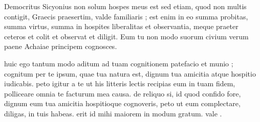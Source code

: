 


 Democritus Sicyonius non solum hospes meus est sed etiam, quod non multis contigit, Graecis praesertim, valde familiaris ; est enim in eo summa probitas, summa virtus, summa in hospites liberalitas et observantia, meque praeter ceteros et colit et observat et diligit. Eum tu non modo suorum civium verum paene Achaiae principem cognosces.

 huic ego tantum modo aditum ad tuam cognitionem patefacio et munio ; cognitum per te ipsum, quae tua natura est, dignum tua amicitia atque hospitio iudicabis. peto igitur a te ut his litteris lectis recipias eum in tuam fidem, polliceare omnia te facturum mea causa. de reliquo si, id quod confido fore, dignum eum tua amicitia hospitioque cognoveris, peto ut eum complectare, diligas, in tuis habeas. erit id mihi maiorem in modum gratum. vale .
